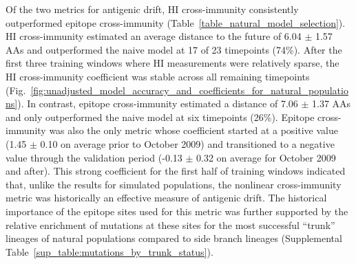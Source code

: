 Of the two metrics for antigenic drift, HI cross-immunity consistently outperformed epitope cross-immunity (Table~\ref{table_natural_model_selection}).
HI cross-immunity estimated an average distance to the future of 6.04 $\pm$ 1.57 AAs and outperformed the naive model at 17 of 23 timepoints (74\%).
After the first three training windows where HI measurements were relatively sparse, the HI cross-immunity coefficient was stable across all remaining timepoints (Fig.~\ref{fig:unadjusted_model_accuracy_and_coefficients_for_natural_populations}).
In contrast, epitope cross-immunity estimated a distance of 7.06 $\pm$ 1.37 AAs and only outperformed the naive model at six timepoints (26\%).
Epitope cross-immunity was also the only metric whose coefficient started at a positive value (1.45 $\pm$ 0.10 on average prior to October 2009) and transitioned to a negative value through the validation period (-0.13 $\pm$ 0.32 on average for October 2009 and after).
This strong coefficient for the first half of training windows indicated that, unlike the results for simulated populations, the nonlinear cross-immunity metric was historically an effective measure of antigenic drift.
The historical importance of the epitope sites used for this metric was further supported by the relative enrichment of mutations at these sites for the most successful ``trunk'' lineages of natural populations compared to side branch lineages (Supplemental Table~\ref{sup_table:mutations_by_trunk_status}).

